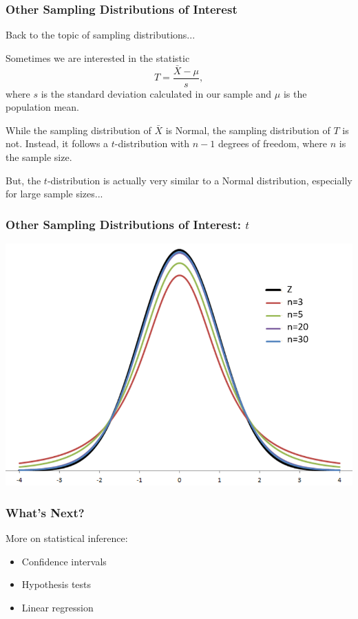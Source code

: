 \documentclass[12pt, 
hyperref={colorlinks=true, linkcolor=blue, urlcolor=cyan}]{beamer}
\begin{document}

\begin{frame}
\frametitle{Other Sampling Distributions of Interest}

Back to the topic of sampling distributions...

Sometimes we are interested in the statistic $$T = \frac{\bar{X}-\mu}{s},$$ where $s$ is the standard deviation calculated in our sample and $\mu$ is the population mean. 

While the sampling distribution of $\bar{X}$ is Normal, the sampling distribution of $T$ is not. Instead, it follows a $t$-distribution with $n-1$ degrees of freedom, where $n$ is the sample size.

But, the $t$-distribution is actually very similar to a Normal distribution, especially for large sample sizes...

\end{frame}

\begin{frame}
\frametitle{Other Sampling Distributions of Interest: $t$}

\center \includegraphics[height=0.8\textheight]{./t-normal} %

\end{frame}


\begin{frame}
\frametitle{What's Next?}

More on statistical inference:
\begin{itemize}
\item Confidence intervals
\item Hypothesis tests
\item Linear regression
\end{itemize}

\end{frame}
\end{document}
